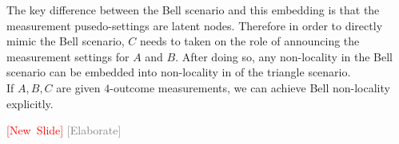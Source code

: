 \documentclass{article}
\newcommand{\newslide}{\textcolor{red}{[New~Slide]}}
\newcommand{\elaborate}{\textcolor{gray}{[Elaborate]}}
\begin{document}
    The key difference between the Bell scenario and this embedding is that the measurement pusedo-settings are latent nodes. Therefore in order to directly mimic the Bell scenario, $C$ needs to taken on the role of announcing the measurement settings for $A$ and $B$. After doing so, any non-locality in the Bell scenario can be embedded into non-locality in of the triangle scenario. \\

    If $A,B,C$ are given $4$-outcome measurements, we can achieve Bell non-locality explicitly.

    \newslide
    \elaborate


    \printbibliography
\end{document}
